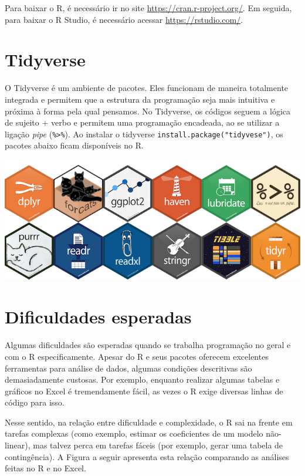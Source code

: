 \documentclass[
]{book}
\begin{document}
Para baixar o R, é necessário ir no site
\url{https://cran.r-project.org/}. Em seguida, para baixar o R Studio, é
necessário acessar \url{https://rstudio.com/}.

\hypertarget{tidyverse}{%
\section{Tidyverse}\label{tidyverse}}

O Tidyverse é um ambiente de pacotes. Eles funcionam de maneira
totalmente integrada e permitem que a estrutura da programação seja mais
intuitiva e próxima à forma pela qual pensamos. No Tidyverse, os códigos
seguem a lógica de sujeito + verbo e permitem uma programação encadeada,
ao se utilizar a ligação \emph{pipe} (\texttt{\%\textgreater{}\%}). Ao
instalar o tidyverse \texttt{install.package("tidyvese")}, os pacotes
abaixo ficam disponíveis no R.

\includegraphics{./img/tidyverse_website.PNG}

\hypertarget{dificuldades-esperadas}{%
\section{Dificuldades esperadas}\label{dificuldades-esperadas}}

Algumas dificuldades são esperadas quando se trabalha programação no
geral e com o R especificamente. Apesar do R e seus pacotes oferecem
excelentes ferramentas para análise de dados, algumas condições
descritivas são demasiadamente custosas. Por exemplo, enquanto realizar
algumas tabelas e gráficos no Excel é tremendamente fácil, as vezes o R
exige diversas linhas de código para isso.

Nesse sentido, na relação entre dificuldade e complexidade, o R sai na
frente em tarefas complexas (como exemplo, estimar os coeficientes de um
modelo não-linear), mas talvez perca em tarefas fáceis (por exemplo,
gerar uma tabela de contingência). A Figura a seguir apresenta esta
relação comparando as análises feitas no R e no Excel.
\end{document}
